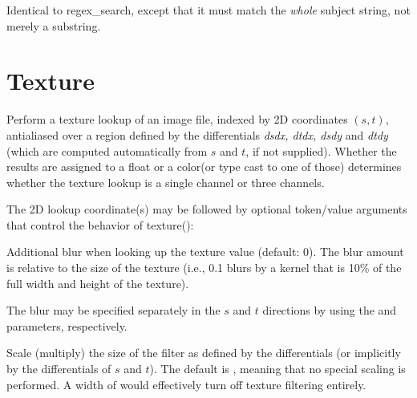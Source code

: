 \documentclass[11pt,letterpaper]{book}
\def\color{{\cf color}\xspace}
\def\float{{\cf float}\xspace}
\begin{document}
\apiend

Identical to {\cf regex_search}, except that it must match the
\emph{whole} {\cf subject} string, not merely a substring.
\apiend




\section{Texture}
\label{sec:stdlib:texture}


Perform a texture lookup of an image file, indexed by 2D coordinates
$(s,t)$, antialiased over a region defined by the differentials
\emph{dsdx, dtdx, dsdy} and \emph{dtdy} (which are computed
automatically from $s$ and $t$, if not supplied).  Whether the results
are assigned to a \float or a \color (or type cast to one of those)
determines whether the texture lookup is a single channel or three
channels.

The 2D lookup coordinate(s) may be followed by optional token/value
arguments that control the behavior of {\cf texture()}:

\vspace{12pt}
Additional blur when looking up the texture value (default: 0).  The
blur amount is relative to the size of the texture (i.e., 0.1 blurs by a
kernel that is 10\% of the full width and height of the texture).

The blur may be specified separately in the $s$ and $t$ directions by
using the  and  parameters, respectively.
\apiend
\vspace{-16pt}

\vspace{12pt}
Scale (multiply) the size of the filter as defined by the differentials
(or implicitly by the differentials of $s$ and $t$).  The default is
{}, meaning that no special scaling is performed.  A width of
{} would effectively turn off texture filtering entirely.
\end{document}

